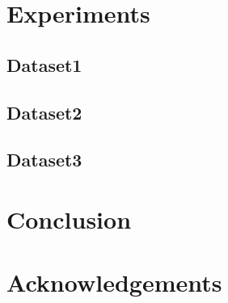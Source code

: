 \documentclass{article}
\begin{document}
\section{Experiments}
    \subsection{Dataset1}
    \subsection{Dataset2}
    \subsection{Dataset3}

\section{Conclusion}

\section*{Acknowledgements}
\end{document}
